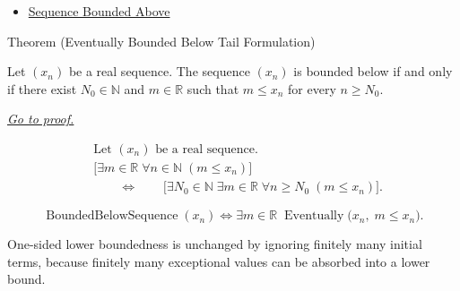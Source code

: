 \begin{dependencies}
\begin{itemize}
  \item \hyperref[def:sequence-bounded-above]{Sequence Bounded Above}
\end{itemize}
\end{dependencies}


\begin{theorembox}{Theorem (Eventually Bounded Below Tail Formulation)}
\begin{theorem}
\label{thm:eventually-bounded-below-tail-formulation}
Let $(x_n)$ be a real sequence. The sequence $(x_n)$ is bounded below if and
only if there exist $N_0 \in \mathbb{N}$ and $m \in \mathbb{R}$ such that
$m \le x_n$ for every $n \ge N_0$.

\smallskip
\noindent
\hyperref[prf:eventually-bounded-below-tail-formulation]{\textit{Go to proof.}}
\end{theorem}
\end{theorembox}

\begin{remark*}
\[
\begin{aligned}
&\text{Let } (x_n) \text{ be a real sequence.}\\
&\bigl[
\exists m \in \mathbb{R}\;
\forall n \in \mathbb{N}\;(m \le x_n)
\bigr]\\
&\qquad\Longleftrightarrow\qquad
\bigl[
\exists N_0 \in \mathbb{N}\;
\exists m \in \mathbb{R}\;
\forall n \ge N_0\;(m \le x_n)
\bigr].
\end{aligned}
\]
\end{remark*}

\begin{remark*}
\[
\operatorname{BoundedBelowSequence}(x_n)
\Longleftrightarrow
\exists m \in \mathbb{R}\;
\operatorname{Eventually}\bigl(x_n,\; m \le x_n\bigr).
\]
\end{remark*}

\begin{remark*}[Interpretation]
One-sided lower boundedness is unchanged by ignoring finitely many initial
terms, because finitely many exceptional values can be absorbed into a lower
bound.
\end{remark*}

